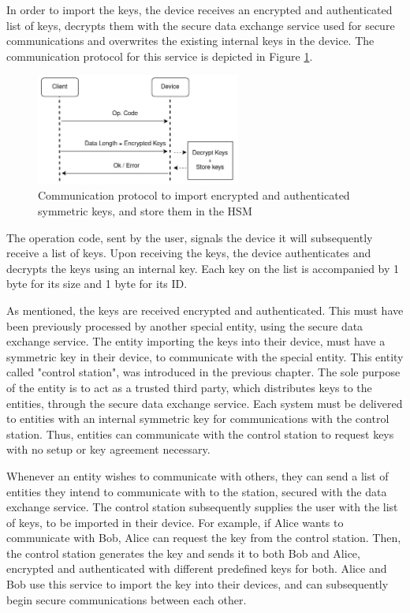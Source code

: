 In order to import the keys, the device receives an encrypted and authenticated list of keys, decrypts them with the secure data exchange service used for secure communications and overwrites the existing internal keys in the device.
The communication protocol for this service is depicted in Figure \ref{fig:protocol:import-keys}.
\begin{figure}[h!]
	\centering
	\includegraphics[width=0.60\textwidth]{./Images/import-keys.png}
	\caption{Communication protocol to import encrypted and authenticated symmetric keys, and store them in the HSM}
	\label{fig:protocol:import-keys}
\end{figure}

The operation code, sent by the user, signals the device it will subsequently receive a list of keys. Upon receiving the keys, the device authenticates and decrypts the keys using an internal key.
Each key on the list is accompanied by 1 byte for its size and 1 byte for its ID.

As mentioned, the keys are received encrypted and authenticated. This must have been previously processed by another special entity, using the secure data exchange service.
The entity importing the keys into their device, must have a symmetric key in their device, to communicate with the special entity. This entity called "control station", was introduced in the previous chapter.
The sole purpose of the entity is to act as a trusted third party, which distributes keys to the entities, through the secure data exchange service.
Each system must be delivered to entities with an internal symmetric key for communications with the control station. Thus, entities can communicate with the control station to request keys with no setup or key agreement necessary.

Whenever an entity wishes to communicate with others, they can send a list of entities they intend to communicate with to the station, secured with the data exchange service. The control station subsequently supplies the user with the list of keys, to be imported in their device.
For example, if Alice wants to communicate with Bob, Alice can request the key from the control station. Then, the control station generates the key and sends it to both Bob and Alice, encrypted and authenticated with different predefined keys for both.
Alice and Bob use this service to import the key into their devices, and can subsequently begin secure communications between each other.


